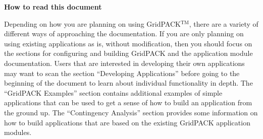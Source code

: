 \textbf{How to read this document}

Depending on how you are planning on using GridPACK$\mathrm{{}^{TM}}$, there are a variety of different ways of approaching the documentation. If you are only planning on using existing applications as is, without modification, then you should focus on the sections for configuring and building GridPACK and the application module documentation. Users that are interested in developing their own applications may want to scan the section ``Developing Applications'' before going to the beginning of the document to learn about individual functionality in depth. The ``GridPACK Examples'' section contains additional examples of simple applications that can be used to get a sense of how to build an application from the ground up. The ``Contingency Analysis'' section provides some information on how to build applications that are based on the existing GridPACK application modules.
\newline
\hyperlink{topDoc}{\color{blue}{Top}}
\eject
